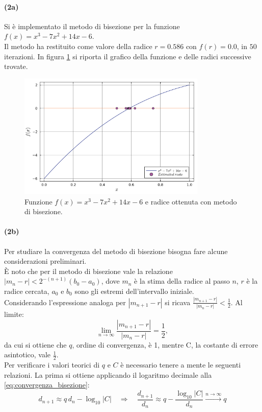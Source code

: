 \documentclass[letterpaper, 12pt]{article}
\numberwithin{equation}{section}    %
\begin{document}
\paragraph{(2a)}Si è implementato il metodo di bisezione per la funzione $f(x) = x^3 - 7x^2 + 14x - 6$. \\
Il metodo ha restituito come valore della radice $r = 0.586$ con $f(r) = 0.0$, in $50$ iterazioni. In
figura \ref{fig:es3_2_2_1} si riporta il grafico della funzione e delle radici successive trovate.
\begin{figure}[!ht]
    \centering
    \includegraphics[width=0.8\textwidth]{3221.pdf}
    \caption{Funzione $f(x) = x^3 - 7x^2 + 14x - 6$ e radice ottenuta con metodo di bisezione.}
    \label{fig:es3_2_2_1}
\end{figure} 

\paragraph{(2b)}Per studiare la convergenza del metodo di bisezione bisogna fare alcune considerazioni 
preliminari. \\
È noto che per il metodo di bisezione vale la relazione $ |m_n-r|< 2^{-(n+1)} (b_0-a_0) $, dove $m_n$ è 
la stima della radice al passo $n$, $r$ è la radice cercata, $a_0$ e $b_0$ sono gli estremi dell'intervallo 
iniziale. \\
Considerando l'espressione analoga per $ |m_{n+1}-r|$ si ricava $\frac{|m_{n+1}-r|}{|m_n-r|} < \frac{1}{2}$. 
Al limite: 
\begin{equation}
    \label{eq:convergenza_bisezione}
    \lim_{n\to\infty} \frac{|m_{n+1}-r|}{|m_n-r|} = \frac{1}{2}, 
\end{equation}
da cui si ottiene che $q$, ordine di convergenza, 
è 1, mentre C, la costante di errore asintotico, vale $\frac{1}{2}$. \\
Per verificare i valori teorici di $q$ e $C$ è necessario tenere a mente le seguenti relazioni. La prima si ottiene
applicando il logaritmo decimale alla \ref{eq:convergenza_bisezione}:
\begin{equation}
    \label{eq:convergenza_bisezione_log}
    d_{n+1} \approx q\, d_n - \log_{10}|C|
    \quad\Rightarrow\quad
    \frac{d_{n+1}}{d_n} \approx q - \frac{\log_{10}|C|}{d_n}
    \overset{n\to\infty}{\longrightarrow} q
\end{equation}
\end{document}
